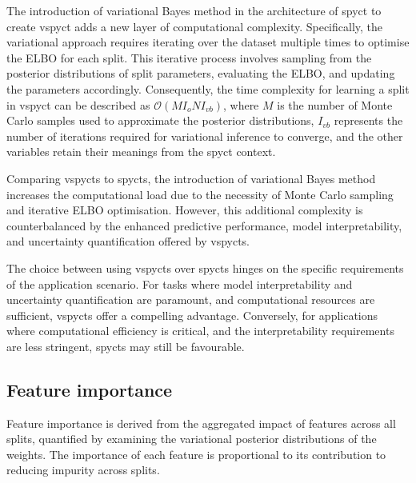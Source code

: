 \documentclass[3p,review,authoryear]{elsarticle}
\begin{document}
The introduction of variational Bayes method in the architecture of \gls{spyct} to create \gls{vspyct} adds a new layer of computational complexity.
Specifically, the variational approach requires iterating over the dataset multiple times to optimise the ELBO for each split.
This iterative process involves sampling from the posterior distributions of split parameters, evaluating the ELBO, and updating the parameters accordingly.
Consequently, the time complexity for learning a split in \gls{vspyct} can be described as $\mathcal{O}(MI_oNI_{vb})$, where $M$ is the number of Monte Carlo samples used to approximate the posterior distributions, $I_{vb}$ represents the number of iterations required for variational inference to converge, and the other variables retain their meanings from the \gls{spyct} context.

Comparing \glspl{vspyct} to \glspl{spyct}, the introduction of variational Bayes method increases the computational load due to the necessity of Monte Carlo sampling and iterative ELBO optimisation.
However, this additional complexity is counterbalanced by the enhanced predictive performance, model interpretability, and uncertainty quantification offered by \glspl{vspyct}.

The choice between using \glspl{vspyct} over \glspl{spyct} hinges on the specific requirements of the application scenario.
For tasks where model interpretability and uncertainty quantification are paramount, and computational resources are sufficient, \glspl{vspyct} offer a compelling advantage.
Conversely, for applications where computational efficiency is critical, and the interpretability requirements are less stringent, \glspl{spyct} may still be favourable.

\subsection{Feature importance}

Feature importance is derived from the aggregated impact of features across all splits, quantified by examining the variational posterior distributions of the weights.
The importance of each feature is proportional to its contribution to reducing impurity across splits.
\end{document}

